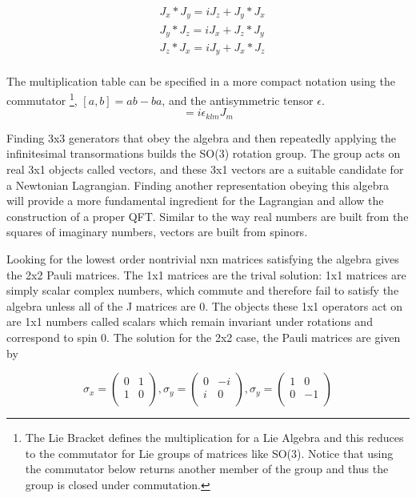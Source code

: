 \begin{equation}
\begin{split}
&J_x*J_y = iJ_z  + J_y*J_x \\
&J_y*J_z = iJ_x  + J_z*J_y \\
&J_z*J_x = iJ_y  + J_x*J_z \\
\end{split}
\end{equation}

The multiplication table can be specified in a more compact notation using the commutator \footnote{The Lie Bracket defines the multiplication for a Lie Algebra and this reduces to the commutator for Lie groups of matrices like SO(3). Notice that using the commutator below returns another member of the group and thus the group is closed under commutation.}, $[a,b] = ab - ba$, and the antisymmetric tensor $\epsilon$.
\begin{equation}
[J_k, J_l] = i\epsilon_{klm}J_m
\end{equation}

Finding 3x3 generators that obey the algebra and then repeatedly applying the infinitesimal transormations builds the SO(3) rotation group. The group acts on real 3x1 objects called vectors, and these 3x1 vectors are a suitable candidate for a Newtonian Lagrangian. Finding another representation obeying this algebra will provide a more fundamental ingredient for the Lagrangian and allow the construction of a proper QFT. Similar to the way real numbers are built from the squares of imaginary numbers, vectors are built from spinors. 

Looking for the lowest order nontrivial nxn matrices satisfying the algebra gives the 2x2 Pauli matrices. The 1x1 matrices are the trival solution: 1x1 matrices are simply scalar complex numbers, which commute and therefore fail to satisfy the algebra unless all of the J matrices are 0. The objects these 1x1 operators act on are 1x1 numbers called scalars which remain invariant under rotations and correspond to spin 0. The solution for the 2x2 case, the Pauli matrices are given by

\begin{equation}
\sigma_x = 
\begin{pmatrix}
0 & 1 \\
1 & 0 \\
\end{pmatrix},
\sigma_y = 
\begin{pmatrix}
0 & -i \\
i & 0 \\
\end{pmatrix},
\sigma_y = 
\begin{pmatrix}
1 & 0 \\
0 & -1 \\
\end{pmatrix}
\end{equation}

